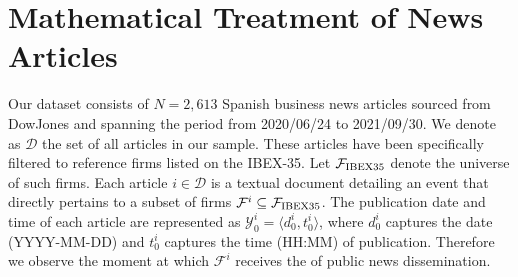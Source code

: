 \section{Mathematical Treatment of News Articles}

 \hspace{0.5cm} 
 Our dataset consists of $N=2,613$ Spanish business news articles 
 sourced from DowJones and spanning the period from 2020/06/24 to 2021/09/30. 
 We denote as $\mathcal D$ the set of all articles in our sample.
 These articles have been specifically filtered to reference firms listed on the IBEX-35.
 Let $\mathcal{F}_{\text{IBEX35}}$ denote the universe of such firms. 
 Each article $i \in \mathcal{D}$ is a textual document detailing an event that directly pertains to a subset of firms $\mathcal{F}^i \subseteq \mathcal{F}_{\text{IBEX35}}$.
%
The publication date and time of each article are represented as $\mathcal{Y}_0^i = \langle d_0^i, t_0^i \rangle$, where $d_0^i$ captures the date 
(YYYY-MM-DD) 
and $t_0^i$ captures the time
 (HH:MM) 
 of publication. 
Therefore we observe
the moment at which $\mathcal{F}^i$ receives the  of public news dissemination. 

%

